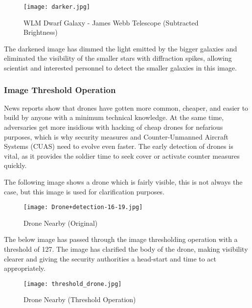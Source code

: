 \begin{figure}[H]
	\centering
	\texttt{[image: darker.jpg]}
	\caption{ WLM Dwarf Galaxy - James Webb Telescope (Subtracted Brightness) }
	\label{fig:resultsjwbdarkened}  
\end{figure}

\par The darkened image has dimmed the light emitted by the bigger galaxies and eliminated the visibility of the smaller stars with diffraction spikes, allowing scientist and interested personnel to detect the smaller galaxies in this image. \newline

\subsubsection{Image Threshold Operation}
\par News reports show that drones have gotten more common, cheaper, and easier to build by anyone with a minimum technical knowledge. At the same time, adversaries get more insidious with hacking of cheap drones for nefarious purposes, which is why security measures and Counter-Unmanned Aircraft Systems (CUAS) need to evolve even faster. The early detection of drones is vital, as it provides the soldier time to seek cover or activate counter measures quickly. \newline
\par The following image shows a drone which is fairly visible, this is not always the case, but this image is used for clarification purposes. \newline

\begin{figure}[H]
	\centering
	\texttt{[image: Drone+detection-16-19.jpg]}
	\caption{ Drone Nearby (Original) \cite{SquareheadTechnology} }
	\label{fig:resultsdrone}  
\end{figure}

\par The below image has passed through the image thresholding operation with a threshold of 127. The image has clarified the body of the drone, making visibility clearer and giving the security authorities a head-start and time to act appropriately.  \newline

\begin{figure}[H]
	\centering
	\texttt{[image: threshold\_drone.jpg]}
	\caption{ Drone Nearby (Threshold Operation) }
	\label{fig:resultsdronethresh}  
\end{figure}

